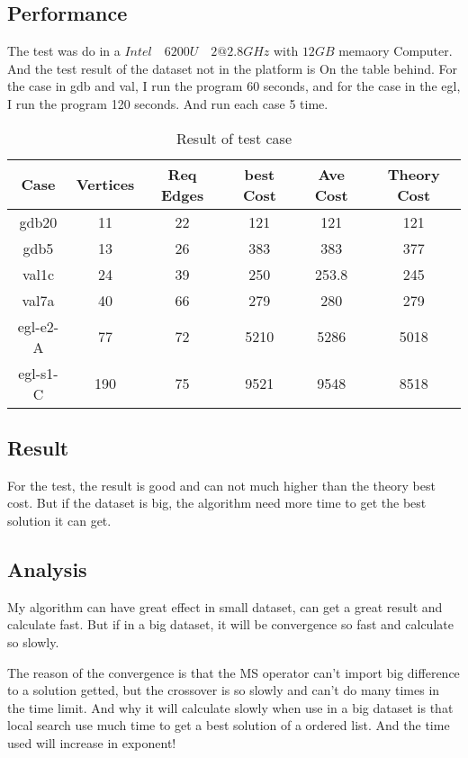 \documentclass[conference,compsoc]{IEEEtran}
\begin{document}
  \subsection{Performance}
    The test was do in a $Intel\quad 6200U\quad 2@2.8GHz$ with $12GB$ memaory Computer.  
    And the test result of the dataset not in the platform is On the table behind.
    For the case in gdb and val, I run the program 60 seconds, and for the case in the egl, I run the program 120 seconds.
    And run each case 5 time.
    \begin{table}[!htbp]
      \centering
      \caption{Result of test case}\label{tab:aStrangeTable}
      \begin{tabular}{|c|c|c|c|c|c|}
        \hline
        \textbf{Case} & \textbf{Vertices} & \textbf{Req Edges} & \textbf{best Cost} & \textbf{Ave Cost} & \textbf{Theory Cost}\\
        \hline
        gdb20 & 11 & 22 & 121 & 121 & 121 \\
        \hline
        gdb5 & 13 & 26 & 383 & 383 & 377 \\
        \hline
        val1c & 24 & 39 & 250 & 253.8& 245 \\
        \hline
        val7a & 40 & 66 & 279 & 280 & 279 \\
        \hline
        egl-e2-A & 77 & 72 & 5210 & 5286 & 5018 \\
        \hline
        egl-s1-C & 190 & 75 & 9521 & 9548 & 8518 \\
        \hline
      \end{tabular}
    \end{table}
  \subsection{Result}
    For the test, the result is good and can not much higher than the theory best cost.
    But if the dataset is big, the algorithm need more time to get the best solution it can get.
  \subsection{Analysis}
    My algorithm can have great effect in small dataset, can get a great result and calculate fast.
    But if in a big dataset, it will be convergence so fast and calculate so slowly.

    The reason of the convergence is that the MS operator can't import big difference to a solution getted, but the crossover is so slowly and can't do many times in the time limit.
    And why it will calculate slowly when use in a big dataset is that local search use much time to get a best solution of a ordered list. And the time used will increase in exponent!
    


\cite{tang2009memetic}
\cite{lacomme2001genetic}
\cite{dror2012arc}
\cite{ulusoy1985fleet}
\end{document}
